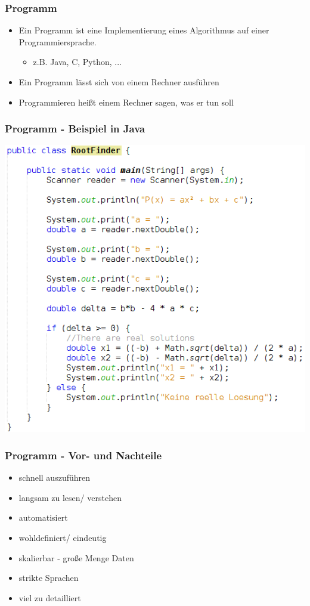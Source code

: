 \documentclass{beamer}
\begin{document}
	\begin{frame}
		\frametitle{Programm}
		\begin{itemize}
			\item Ein Programm ist eine Implementierung eines Algorithmus auf einer Programmiersprache.
			\begin{itemize}
				\item z.B. Java, C, Python, ...
			\end{itemize}
			\item Ein Programm lässt sich von einem Rechner ausführen
			\item Programmieren heißt einem Rechner sagen, was er tun soll
		\end{itemize}
	\end{frame}

	\begin{frame}
		\frametitle{Programm - Beispiel in Java}
		\includegraphics[height=.8\textheight]{Nullstellen-Java}
	\end{frame}

	\begin{frame}
		\frametitle{Programm - Vor- und Nachteile}
		\begin{itemize}
			\item {\color{green} schnell auszuführen}
			\item {\color{red} langsam zu lesen/ verstehen}
			\pause
			\vspace{10pt}
			\item {\color{green} automatisiert}
			\item {\color{green} wohldefiniert/ eindeutig}
			\item {\color{green} skalierbar - große Menge Daten}
			\pause
			\vspace{10pt}
			\item {\color{red} strikte Sprachen}
			\item {\color{red} viel zu detailliert}
		\end{itemize}
	\end{frame}
\end{document}
